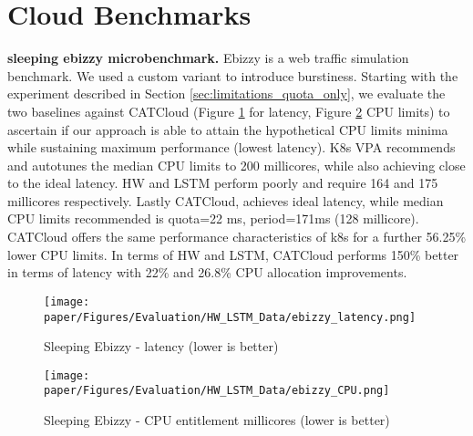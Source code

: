 
\section{Cloud Benchmarks}

\textbf{sleeping ebizzy microbenchmark.} Ebizzy \cite{henson_ebizzy_2008} is a web traffic simulation benchmark. We used a custom variant \cite{bhat_pratiksampatsleeping-ebizzy_2014} to introduce burstiness. Starting with the experiment described in Section 
\ref{sec:limitations_quota_only}, we evaluate the two baselines against CATCloud (Figure \ref{ebizzy_latency} for latency, Figure \ref{ebizzy_ent} CPU limits) to ascertain if our approach is able to attain the hypothetical CPU limits minima while sustaining maximum performance (lowest latency).
K8s VPA recommends and autotunes the median CPU limits to 200 millicores, while also achieving close to the ideal latency. HW and LSTM perform poorly and require 164 and 175 millicores respectively. Lastly CATCloud, achieves ideal latency, while median CPU limits recommended is quota=22 ms, period=171ms (128 millicore). CATCloud offers the same performance characteristics of k8s for a further 56.25\% lower CPU limits. In terms of HW and LSTM, CATCloud performs 150\% better in terms of latency with 22\% and 26.8\% CPU allocation improvements.
\begin{figure}[h]
  \centering
  \texttt{[image: paper/Figures/Evaluation/HW\_LSTM\_Data/ebizzy\_latency.png]}
  \caption{Sleeping Ebizzy - latency (lower is better)}\label{ebizzy_latency}
  \end{figure}

  \begin{figure}[h]
    \centering
    \texttt{[image: paper/Figures/Evaluation/HW\_LSTM\_Data/ebizzy\_CPU.png]}
    \caption{Sleeping Ebizzy - CPU entitlement millicores (lower is better)}\label{ebizzy_ent}
    \end{figure}




